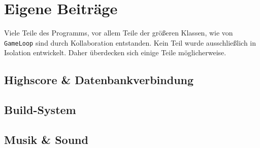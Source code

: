 \section{Eigene Beiträge}

Viele Teile des Programms, vor allem Teile der größeren Klassen, wie von \texttt{GameLoop} sind durch Kollaboration entstanden.
Kein Teil wurde ausschließlich in Isolation entwickelt.
Daher überdecken sich einige Teile möglicherweise.

\subsection{Highscore \& Datenbankverbindung}

\subsection{Build-System}

\subsection{Musik \& Sound}
